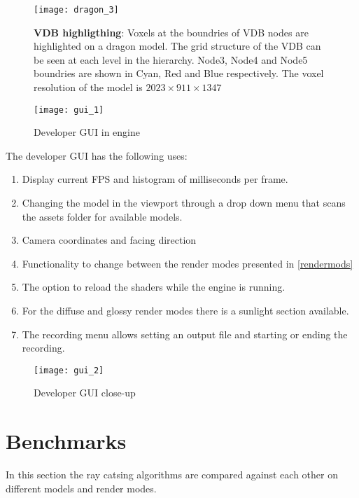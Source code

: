 \begin{figure}[H]
  \centering
  \texttt{[image: dragon\_3]}
  \caption{\textbf{VDB highligthing}: Voxels at the boundries of VDB nodes are highlighted on a dragon model. The grid structure of the VDB can be seen at each level in the hierarchy. Node3, Node4 and Node5 boundries are shown in Cyan, Red and Blue respectively. The voxel resolution of the model is $2023\times911\times1347$}
\end{figure}

\begin{multicols}{2}[]
  \begin{figure}[H]
    \centering
    \texttt{[image: gui\_1]}
    \caption{Developer GUI in engine}
  \end{figure}
  The developer GUI has the following uses:
  \begin{enumerate}[itemstep=0mm]
    \item Display current \acrshort{FPS} and histogram of milliseconds per frame.
    \item Changing the model in the viewport through a drop down menu that scans the assets folder for available models.
    \item Camera coordinates and facing direction
    \item Functionality to change between the render modes presented in \cref{rendermods}
    \item The option to reload the shaders while the engine is running.
    \item For the diffuse and glossy render modes there is a sunlight section available.
    \item The recording menu allows setting an output file and starting or ending the recording.
  \end{enumerate}
  \columnbreak
  \begin{figure}[H]
    \centering
    \texttt{[image: gui\_2]}
    \caption{Developer GUI close-up}
    \label{gui}
  \end{figure}
\end{multicols}

\section{Benchmarks}
In this section the ray catsing algorithms are compared against each other on different models and render modes.

